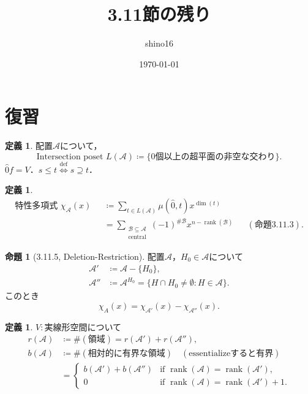 \documentclass[xelatex,ja=standard,a4paper,14pt,everyparhook=compat]{bxjsarticle}
\title{3.11節の残り}
\author{shino16}
\date{\today}
\newcommand{\mcA}{\mathcal{A}}
\newcommand{\mcB}{\mathcal{B}}
\DeclareMathOperator{\rank}{rank}
\theoremstyle{definition}
\newtheorem{definition}[theorem]{定義}
\newtheorem{proposition}[theorem]{命題}
\begin{document}
\maketitle

\tableofcontents

\newpage

\setcounter{section}{-1}
\section{復習}

\begin{definition}
    配置$\mcA$について， \begin{equation*}
        \text{Intersection poset $L(\mcA) \coloneqq \{\text{$0$個以上の超平面の非空な交わり}\}$}.
    \end{equation*}
    $\hat 0f = V$．$s \leq t \overset{\mathrm{def}}{\Longleftrightarrow} s \supseteq t$．
\end{definition}

\begin{definition}
    \begin{align*}
        \text{特性多項式 $\chi_\mcA(x)$ }
         & \coloneqq \sum_{t \in L(\mcA)} \mu(\hat0, t) x^{\dim(t)} \\
         & = \sum_{\substack{\mcB \subseteq \mcA                    \\ \text{central}}} (-1)^{\#\mcB} x^{n - \rank(\mcB)} && (\text{命題3.11.3}).
    \end{align*}
\end{definition}

\begin{proposition}[3.11.5, Deletion-Restriction]
    配置$\mcA$，$H_0 \in \mcA$について \begin{align*}
        \mcA'  & \coloneqq \mcA - \{H_0\},                                          \\
        \mcA'' & \coloneqq \mcA^{H_0} = \{H \cap H_0 \neq \emptyset : H \in \mcA\}.
    \end{align*}
    このとき \begin{equation*}
        \chi_A(x) = \chi_{\mcA'}(x) - \chi_{\mcA''}(x).
    \end{equation*}
\end{proposition}

\begin{definition}
    $V : \text{実線形空間}$について \begin{align*}
        r(\mcA) & \coloneqq \#(\text{領域}) = r(\mcA') + r(\mcA''),                             \\
        b(\mcA) & \coloneqq \#(\text{相対的に有界な領域}) \quad (\text{essentializeすると有界}) \\
                & = \begin{cases}
            b(\mcA') + b(\mcA'') & \text{if $\rank(\mcA) = \rank(\mcA')$,}     \\
            0                    & \text{if $\rank(\mcA) = \rank(\mcA') + 1$.}
        \end{cases}
    \end{align*}
\end{definition}
\end{document}
